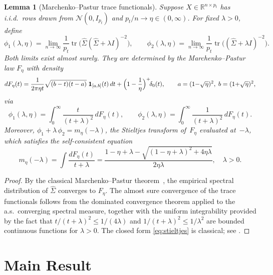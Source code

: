 \documentclass[11pt,a4paper]{article}
\newtheorem{lemma}[theorem]{Lemma}
\theoremstyle{definition}
\DeclareMathOperator{\tr}{tr}
\newcommand{\R}{\mathbb{R}}
\newcommand{\N}{\mathcal{N}}
\begin{document}
\begin{lemma}[Marchenko--Pastur trace functionals]%
\label{lem:MP}
Suppose $X\in\R^{n\times p_t}$ has i.i.d.\ rows drawn from
$\N(0,I_{p_t})$ and $p_t/n\to\eta\in(0,\infty)$.  For fixed
$\lambda>0$, define
\[
  \phi_1(\lambda,\eta)
  =\lim_{n\to\infty}\frac{1}{p_t}
   \tr\!\bigl(\hat\Sigma(\hat\Sigma+\lambda I)^{-2}\bigr),
  \qquad
  \phi_2(\lambda,\eta)
  =\lim_{n\to\infty}\frac{1}{p_t}
   \tr\!\bigl((\hat\Sigma+\lambda I)^{-2}\bigr).
\]
Both limits exist almost surely.  They are determined by the
Marchenko--Pastur law $F_\eta$ with density
\[
  dF_\eta(t)=\frac{1}{2\pi\eta t}
  \sqrt{(b-t)(t-a)}\;\mathbf{1}_{[a,b]}(t)\,dt
  +\Bigl(1-\frac{1}{\eta}\Bigr)^{+}\!\delta_0(t),
  \qquad a=(1{-}\sqrt\eta)^{2},\;b=(1{+}\sqrt\eta)^{2},
\]
via
\begin{equation}\label{eq:phi12}
  \phi_1(\lambda,\eta)
  =\int_{0}^{\infty}\frac{t}{(t+\lambda)^{2}}\,dF_\eta(t),
  \qquad
  \phi_2(\lambda,\eta)
  =\int_{0}^{\infty}\frac{1}{(t+\lambda)^{2}}\,dF_\eta(t).
\end{equation}
Moreover, $\phi_1+\lambda\,\phi_2 = m_\eta(-\lambda)$, the Stieltjes
transform of~$F_\eta$ evaluated at~$-\lambda$, which satisfies
the self-consistent equation
\begin{equation}\label{eq:stieltjes}
  m_\eta(-\lambda)
  =\int\frac{dF_\eta(t)}{t+\lambda}
  =\frac{1-\eta+\lambda
  -\sqrt{(1-\eta+\lambda)^{2}+4\eta\lambda}}{2\eta\lambda},
  \quad\lambda>0.
\end{equation}
\end{lemma}

\begin{proof}
By the classical Marchenko--Pastur theorem~\cite{MP1967}, the
empirical spectral distribution of $\hat\Sigma$ converges to
$F_\eta$.  The almost sure convergence of the trace functionals
follows from the dominated convergence theorem applied to the a.s.\
converging spectral measure, together with the uniform integrability
provided by the fact that
$t/(t+\lambda)^{2}\le 1/(4\lambda)$ and $1/(t+\lambda)^{2}\le
1/\lambda^{2}$ are bounded continuous functions for $\lambda>0$.
The closed form \eqref{eq:stieltjes} is classical; see
\cite{silverstein1995strong}.
\end{proof}

\section{Main Result}\label{sec:main}
\end{document}
